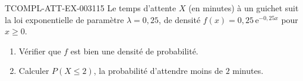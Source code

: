 \begin{exercice}{TCOMPL-ATT-EX-003}{1}{15}
Le temps d'attente $X$ (en minutes) à un guichet suit la loi exponentielle de paramètre $\lambda=0{,}25$, de densité $f(x)=0{,}25\,\mathrm{e}^{-0{,}25x}$ pour $x\geq0$.
\begin{enumerate}
  \item Vérifier que $f$ est bien une densité de probabilité.
  \item Calculer $P(X\leq2)$, la probabilité d'attendre moins de $2$ minutes.
\end{enumerate}
\end{exercice}
